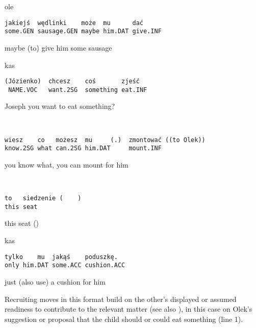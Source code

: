 \documentclass[output=paper]{langsci/langscibook}
\begin{document}
\vspace{2mm}
%
\begin{transbox}{1}{ole}
\begin{verbatim}
jakiejś  wędlinki    może  mu      dać
some.GEN sausage.GEN maybe him.DAT give.INF
\end{verbatim}
maybe (to) give him some sausage
\end{transbox}
%
\begin{transbox}{2}{kas}
\begin{verbatim}
(Józienko)  chcesz    coś       zjeść
 NAME.VOC   want.2SG  something eat.INF
\end{verbatim}
Joseph you want to eat something?\
\end{transbox}
%
\begin{mdframednoverticalspace}[style=firstfoc]
\begin{transbox}{3}{~}
\begin{verbatim}
wiesz    co   możesz  mu     (.)  zmontować ((to Olek))
know.2SG what can.2SG him.DAT     mount.INF
\end{verbatim}
you know what, you can mount for him
\end{transbox}
\end{mdframednoverticalspace}
%
\begin{transbox}{4}{~}
\begin{verbatim}
to   siedzenie (    )
this seat
\end{verbatim}
this seat (\hspace{0.7cm})
\end{transbox}
%
\begin{mdframednoverticalspace}[style=secondfoc]
\end{mdframednoverticalspace}
%
\begin{transbox}{6}{kas}
\begin{verbatim}
tylko    mu  jakąś    poduszkę.
only him.DAT some.ACC cushion.ACC
\end{verbatim}
just (also use) a cushion for him
\end{transbox}
%
\begin{mdframednoverticalspace}[style=secondfoc]
\end{mdframednoverticalspace}

Recruiting moves in this format build on the other’s displayed or assumed readiness to contribute to the relevant matter (see also ), in this case on Olek’s suggestion or proposal that the child should or could eat something (line 1).
\end{document}
